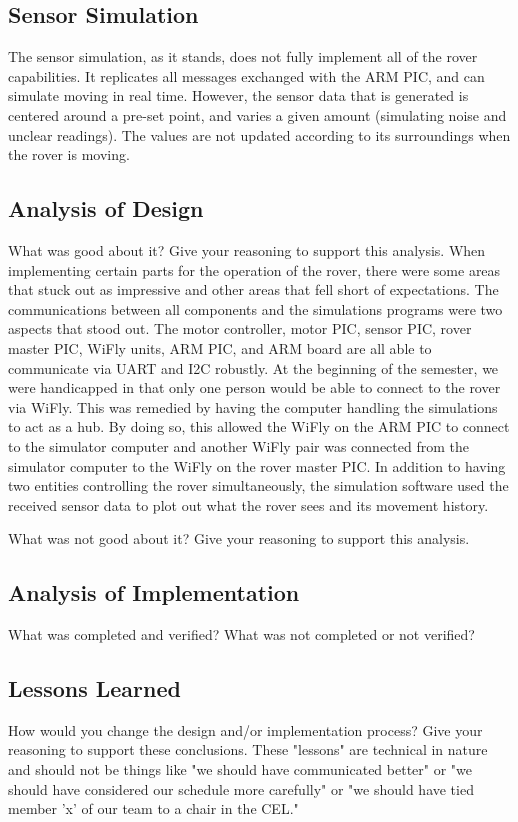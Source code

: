{\subsection{Sensor Simulation}
The sensor simulation, as it stands, does not fully implement all of the rover capabilities. It replicates all messages exchanged with the ARM PIC, and can simulate moving in real time. However, the sensor data that is generated is centered around a pre-set point, and varies a given amount (simulating noise and unclear readings). The values are not updated according to its surroundings when the rover is moving.



\subsection{Analysis of Design}
What was good about it? Give your reasoning to support this analysis.
When implementing certain parts for the operation of the rover, there were some areas that stuck out as impressive and other areas that fell short of expectations. The communications between all components and the simulations programs were two aspects that stood out. The motor controller, motor PIC, sensor PIC, rover master PIC, WiFly units, ARM PIC, and ARM board are all able to communicate via UART and I2C robustly. At the beginning of the semester, we were handicapped in that only one person would be able to connect to the rover via WiFly. This was remedied by having the computer handling the simulations to act as a hub. By doing so, this allowed the WiFly on the ARM PIC to connect to the simulator computer and another WiFly pair was connected from the simulator computer to the WiFly on the rover master PIC. In addition to having two entities controlling the rover simultaneously, the simulation software used the received sensor data to plot out what the rover sees and its movement history.

What was not good about it? Give your reasoning to support this analysis.


\subsection{Analysis of Implementation}
What was completed and verified? What was not completed or not verified?

\subsection{Lessons Learned}
How would you change the design and/or implementation process? Give your reasoning to support these conclusions. These "lessons" are technical in nature and should not be things like "we should have communicated better" or "we should have considered our schedule more carefully" or "we should have tied member 'x' of our team to a chair in the CEL."

}

